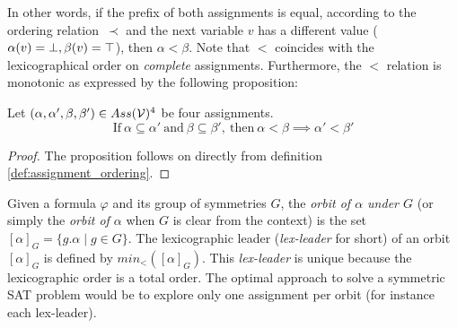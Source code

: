 In other words, if the prefix of both assignments is equal, according to the ordering relation~$\prec$
and the next variable $v$ has a different value ($\alpha(v) = \bot, \beta(v) = \top$), then $\alpha < \beta$.
Note that $<$ coincides with the lexicographical order on \emph{complete}
assignments. 
Furthermore, the $<$ relation is monotonic as expressed by the following proposition:
\begin{proposition}
 \label{prop:monocity_assignments_ordering}
 Let  $(\alpha,\alpha',\beta,\beta') \in Ass(\mathcal{V})^4 $ be four assignments.
 $$\text{If}~\alpha \subseteq \alpha'~\text{and}~\beta \subseteq \beta',~\text{then}~\alpha < \beta \implies \alpha' < \beta'$$
\end{proposition}
\begin{proof}
 The proposition follows on directly from definition \ref{def:assignment_ordering}.
\end{proof}

Given a formula $\varphi$ and its group of symmetries $G$,
the \emph{orbit of $\alpha$ under $G$} (or
simply the \emph{orbit of $\alpha$} when $G$ is clear from the context) is the set
$ [\alpha]_G=\{ g.\alpha \mid g \in G \}$. 
The lexicographic leader (\textit{lex-leader} for short) of an orbit $[\alpha]_G$ is defined by
$min_<([\alpha]_G)$. This \textit{lex-leader} is unique because the lexicographic
order is a total order.
The optimal approach to solve a symmetric SAT problem would be to explore
only one assignment per orbit (for instance each lex-leader).

% 


